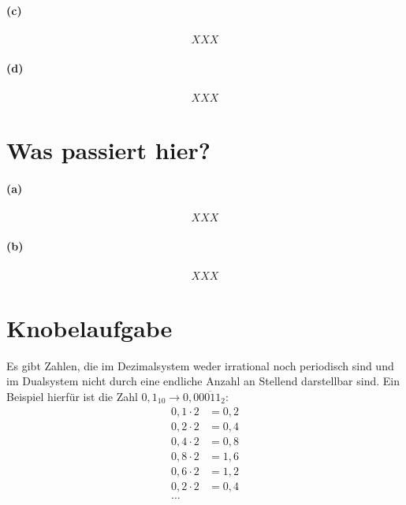 \documentclass[a4paper]{article}
\begin{document}
\paragraph{(c)}
\begin{align*}
XXX
\end{align*}
\paragraph{(d)}
\begin{align*}
XXX
\end{align*}


\section{Was passiert hier?}
\paragraph{(a)}
\begin{align*}
XXX
\end{align*}
\paragraph{(b)}
\begin{align*}
XXX
\end{align*}

\section{Knobelaufgabe}
Es gibt Zahlen, die im Dezimalsystem weder irrational noch periodisch sind und im Dualsystem nicht durch eine endliche Anzahl an Stellend darstellbar sind. Ein Beispiel hierfür ist die Zahl $0,1_{10} \rightarrow 0,0\overline{0011}_{2}$:
\begin{align*}
0,1 \cdot 2 &= 0,2 \\
0,2 \cdot 2 &= 0,4 \\
0,4 \cdot 2 &= 0,8 \\
0,8 \cdot 2 &= 1,6 \\
0,6 \cdot 2 &= 1,2 \\
0,2 \cdot 2 &= 0,4 \\
\text{\ldots}
\end{align*}
\end{document}
